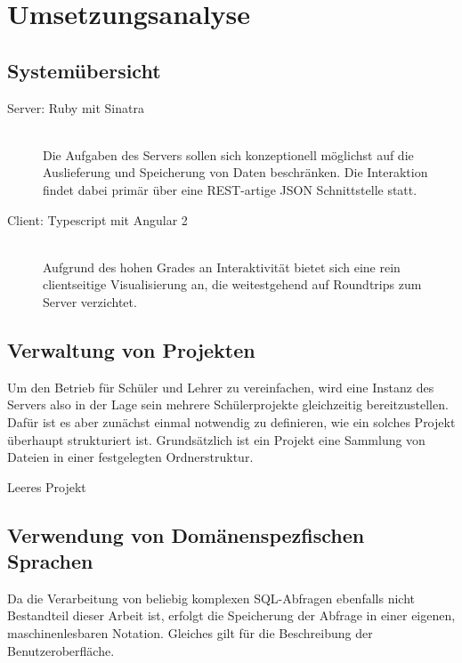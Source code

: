 
\section{Umsetzungsanalyse}
\label{sec:implementation-analysis}


\subsection{Systemübersicht}

\begin{description}
\item[Server: Ruby mit Sinatra] \hfill\\
  Die Aufgaben des Servers sollen sich konzeptionell möglichst auf die Auslieferung und Speicherung von Daten beschränken. Die Interaktion findet dabei primär über eine REST-artige JSON Schnittstelle statt.
\item[Client: Typescript mit Angular 2] \hfill\\
  Aufgrund des hohen Grades an Interaktivität bietet sich eine rein clientseitige Visualisierung an, die weitestgehend auf Roundtrips zum Server verzichtet.
\end{description}

\subsection{Verwaltung von Projekten}

Um den Betrieb für Schüler und Lehrer zu vereinfachen, wird eine Instanz des Servers also in der Lage sein mehrere Schülerprojekte gleichzeitig bereitzustellen. Dafür ist es aber zunächst einmal notwendig zu definieren, wie ein solches Projekt überhaupt strukturiert ist. Grundsätzlich ist ein Projekt eine Sammlung von Dateien in einer festgelegten Ordnerstruktur.

\begin{dirstruct}
  \caption{Leeres Projekt}
\end{dirstruct}

\subsection{Verwendung von Domänenspezfischen Sprachen}

Da die Verarbeitung von beliebig komplexen SQL-Abfragen ebenfalls nicht Bestandteil dieser Arbeit ist, erfolgt die Speicherung der Abfrage in einer eigenen, maschinenlesbaren Notation. Gleiches gilt für die Beschreibung der Benutzeroberfläche.

